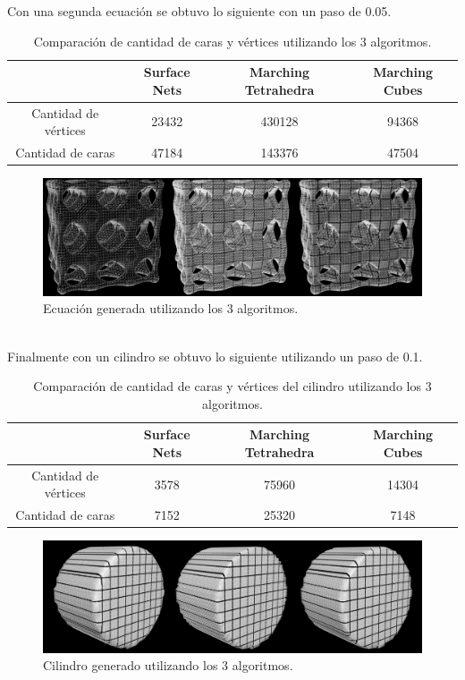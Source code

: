 \documentclass[12pt]{article}
\begin{document}
Con una segunda ecuación se obtuvo lo siguiente con un paso de 0.05.
\begin{table}[h!]
  \centering
  \label{tab:table1}
  \begin{tabular}{cccc}
    \toprule
    & Surface Nets & Marching Tetrahedra & Marching Cubes\\
    \midrule
    Cantidad de vértices & 23432 & 430128 & 94368\\
    Cantidad de caras & 47184 & 143376 & 47504\\
    \bottomrule
  \end{tabular}
  \caption{Comparación de cantidad de caras y vértices utilizando los 3 algoritmos.}
\end{table}
\begin{figure}[h!]
\includegraphics[width=\linewidth,center]{compec2.png}
\caption{Ecuación generada utilizando los 3 algoritmos.}
\end{figure}
\\Finalmente con un cilindro se obtuvo lo siguiente utilizando un paso de 0.1.
\begin{table}[h!]
  \centering
  \label{tab:table1}
  \begin{tabular}{cccc}
    \toprule
    & Surface Nets & Marching Tetrahedra & Marching Cubes\\
    \midrule
    Cantidad de vértices & 3578 & 75960 & 14304\\
    Cantidad de caras & 7152 & 25320 & 7148\\
    \bottomrule
  \end{tabular}
  \caption{Comparación de cantidad de caras y vértices del cilindro utilizando los 3 algoritmos.}
\end{table}
\begin{figure}[h!]
\includegraphics[width=\linewidth,center]{compec3.png}
\caption{Cilindro generado utilizando los 3 algoritmos.}
\end{figure}
\end{document}
